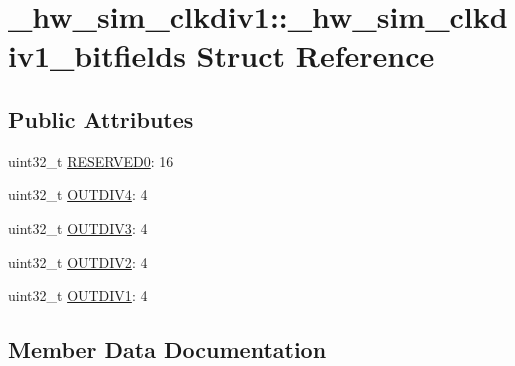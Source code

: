\hypertarget{struct__hw__sim__clkdiv1_1_1__hw__sim__clkdiv1__bitfields}{}\section{\+\_\+hw\+\_\+sim\+\_\+clkdiv1\+:\+:\+\_\+hw\+\_\+sim\+\_\+clkdiv1\+\_\+bitfields Struct Reference}
\label{struct__hw__sim__clkdiv1_1_1__hw__sim__clkdiv1__bitfields}
\subsection*{Public Attributes}
\begin{DoxyCompactItemize}
\item 
uint32\+\_\+t \hyperlink{struct__hw__sim__clkdiv1_1_1__hw__sim__clkdiv1__bitfields_a4fc857dca7ff64486b22d7275fc16f9c}{R\+E\+S\+E\+R\+V\+E\+D0}\+: 16
\item 
uint32\+\_\+t \hyperlink{struct__hw__sim__clkdiv1_1_1__hw__sim__clkdiv1__bitfields_ae4afa2602d724e5f40ca69b84c986711}{O\+U\+T\+D\+I\+V4}\+: 4
\item 
uint32\+\_\+t \hyperlink{struct__hw__sim__clkdiv1_1_1__hw__sim__clkdiv1__bitfields_a758160f6c09dd3545f6c3cde695bc361}{O\+U\+T\+D\+I\+V3}\+: 4
\item 
uint32\+\_\+t \hyperlink{struct__hw__sim__clkdiv1_1_1__hw__sim__clkdiv1__bitfields_a27b73d59cb048762aa52e80b94af908f}{O\+U\+T\+D\+I\+V2}\+: 4
\item 
uint32\+\_\+t \hyperlink{struct__hw__sim__clkdiv1_1_1__hw__sim__clkdiv1__bitfields_a34e26b60a499efcbf6b5e0abcf370c19}{O\+U\+T\+D\+I\+V1}\+: 4
\end{DoxyCompactItemize}


\subsection{Member Data Documentation}

